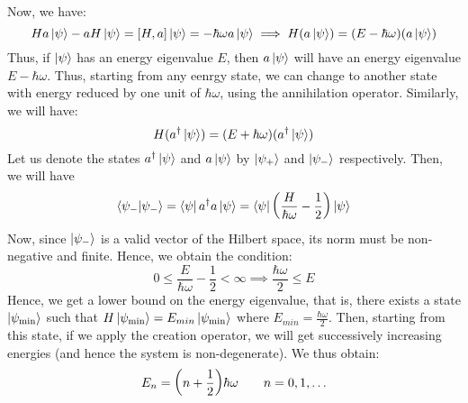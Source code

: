 Now, we have:
$$Ha\ket{\psi} - aH\ket{\psi} = \left[ H, a \right]\ket{\psi} = -\hbar\omega a \ket{\psi} \implies H(a\ket{\psi})= (E-\hbar\omega)(a\ket{\psi})$$
Thus, if $\ket{\psi}$ has an energy eigenvalue $E$, then $a\ket{\psi}$ will have an energy eigenvalue $E-\hbar\omega$. Thus, starting from any eenrgy state, we can change to another state with energy reduced by one unit of $\hbar\omega$, using the annihilation operator. Similarly, we will have:
$$H(a^\dagger\ket{\psi})  = (E+\hbar\omega)(a^\dagger\ket{\psi}) $$
Let us denote the states $a^\dagger\ket{\psi}$ and $a\ket{\psi}$ by $\ket{\psi_+}$ and $\ket{\psi_-}$ respectively. 
Then, we will have $$\ip{\psi_-}{\psi_-} = \bra{\psi} a^\dagger a \ket{\psi} = \bra{{\psi}}\qty(\frac{H}{\hbar\omega}-\frac{1}{2})\ket{\psi}$$
Now, since $\ket{\psi_-}$ is a valid vector of the Hilbert space, its norm must be non-negative and finite. Hence, we obtain the condition:
$$0\leq \frac{E}{\hbar\omega}-\frac{1}{2}<\infty\implies \frac{\hbar\omega}{2}\leq E$$
Hence, we get a lower bound on the energy eigenvalue, that is, there exists a state $\ket{\psi_{\mathrm{min}}}$ such that $H\ket{\psi_{\mathrm{min}}} = E_{min}\ket{\psi_{\mathrm{min}}}$ where $E_{min} = \frac{\hbar\omega}{2}$. Then, starting from this state, if we apply the creation operator, we will get successively increasing energies (and hence the system is non-degenerate). We thus obtain:
$$E_n = \qty({n+\frac{1}{2}}){\hbar\omega}\qquad n = 0,1,\ldots$$
